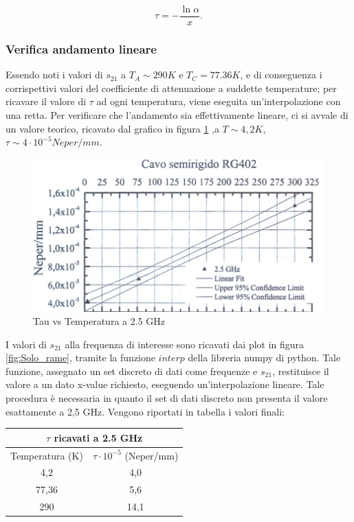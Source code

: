 \begin{equation}
    \tau=-\frac{\ln{\alpha}}{x}.
\end{equation}

\subsubsection{Verifica andamento lineare}
\label{ssec:Verifica andamento lineare}
Essendo noti i valori di $s_{21}$ a $ T_{A}\sim290K $ e $ T_{C} = 77.36K $, e di conseguenza i corrispettivi valori del coefficiente di attenuazione a suddette temperature; per ricavare il valore di $ \tau $ ad ogni temperatura, viene eseguita un'interpolazione con una retta. Per verificare che l'andamento sia effettivamente lineare, ci si avvale di un valore teorico, ricavato dal grafico in figura \ref{fig:Tre_punti} ,a $ T \sim4,2K $,  $ \tau \sim 4\cdot  10^{-5}  Neper/mm$.

\begin{figure}[H]
	\centering
	\includegraphics[scale=0.8]{Tre_punti.png}
	\caption{Tau vs Temperatura a 2.5 GHz}
    	\label{fig:Tre_punti}
\end{figure}

I valori di $s_{21}$ alla frequenza di interesse sono ricavati dai plot in figura \ref{fig:Solo_rame},  tramite la funzione $interp$ della libreria numpy di python. Tale funzione, assegnato un set discreto di dati come frequenze e $s_{21}$, restituisce il valore a un dato x-value richiesto, eseguendo un'interpolazione lineare. Tale procedura è necessaria in quanto il set di dati discreto non presenta il valore esattamente a 2,5 GHz. Vengono riportati in tabella i valori finali:

\begin{table}[h!]
\centering

\begin{tabular}{ |c|c|  }
	\hline
	\multicolumn{2}{|c|}{$\tau $ ricavati a 2.5 GHz} \\
	\hline
	Temperatura (K)& $\tau\cdot  10^{-5}$ (Neper/mm) \\
	\hline
	4,2   &  4,0   \\
	77,36  & 5,6 \\
	290 &14,1 \\
	\hline
\end{tabular}

\end{table}


